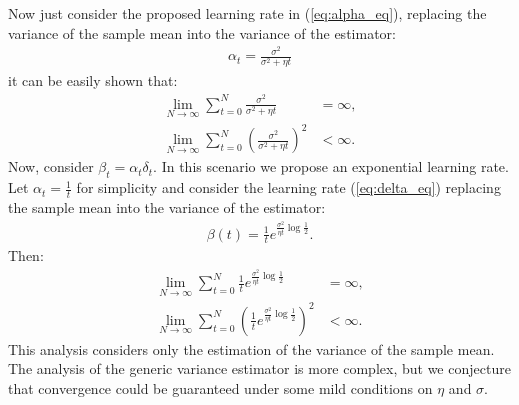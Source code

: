 \documentclass[conference]{IEEEtran}
\begin{document}
Now just consider the proposed learning rate in (\ref{eq:alpha_eq}), replacing the variance of the sample mean into the variance of the estimator:
\begin{align}\label{eq:alpha_smv}
 \alpha_t=\frac{\sigma^2}{\sigma^2+\eta t}
\end{align}
it can be easily shown that:
\begin{align}
 \lim_{N\rightarrow\infty} \sum_{t=0}^{N}\frac{\sigma^2}{\sigma^2+\eta t} & = \infty, \\
 \lim_{N\rightarrow\infty} \sum_{t=0}^{N}\left(\frac{\sigma^2}{\sigma^2+\eta t}\right)^2 & < \infty.
\end{align}
Now, consider $\beta_t=\alpha_t\delta_t$. In this scenario we propose an exponential learning rate. Let $\alpha_t=\frac{1}{t}$ for simplicity and consider the learning rate (\ref{eq:delta_eq}) replacing the sample mean into the variance of the estimator:
\begin{align}\label{eq:beta_delta_smv}
 \beta(t) = \frac{1}{t}e^{\frac{\sigma^2}{\eta t}\log\frac{1}{2}}.
\end{align}
Then:
\begin{align}
 \lim_{N\rightarrow\infty} \sum_{t=0}^{N}\frac{1}{t}e^{\frac{\sigma^2}{\eta t}\log\frac{1}{2}} & = \infty, \\
 \lim_{N\rightarrow\infty} \sum_{t=0}^{N}\left(\frac{1}{t}e^{\frac{\sigma^2}{\eta t}\log\frac{1}{2}}\right)^2 & < \infty.
\end{align}
This analysis considers only the estimation of the variance of the sample mean. The analysis of the generic variance estimator is more complex, but we conjecture that convergence could be guaranteed under some mild conditions on $\eta$ and $\sigma$.
\end{document}
